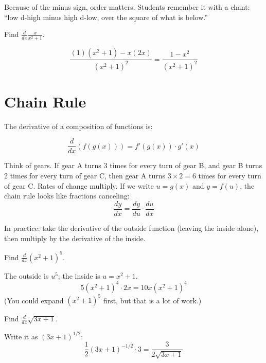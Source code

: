 Because of the minus sign, order matters. Students remember it with a
chant: ``low d-high minus high d-low, over the square of what is
below.''

\begin{Worked}
\begin{Problem}
Find $\frac{d}{dx}\frac{x}{x^2 + 1}$.
\end{Problem}
\begin{Solution}
$$\frac{(1)(x^2 + 1) - x(2x)}{(x^2 + 1)^2} = \frac{1 - x^2}{(x^2 + 1)^2}$$
\end{Solution}
\end{Worked}

\section{Chain Rule}

The derivative of a composition of functions is:

\begin{equation}
\frac{d}{dx}(f(g(x))) = f'(g(x)) \cdot g'(x)
\end{equation}

Think of gears. If gear A turns 3 times for every turn of gear B, and gear
B turns 2 times for every turn of gear C, then gear A turns $3 \times 2 =
6$ times for every turn of gear C. Rates of change multiply. If we write
$u = g(x)$ and $y = f(u)$, the chain rule looks like fractions canceling:
$$\frac{dy}{dx} = \frac{dy}{du} \cdot \frac{du}{dx}$$

In practice: take the derivative of the outside function (leaving the
inside alone), then multiply by the derivative of the inside.

\begin{Worked}
\begin{Problem}
Find $\frac{d}{dx}(x^2 + 1)^5$.
\end{Problem}
\begin{Solution}
The outside is $u^5$; the inside is $u = x^2 + 1$.
$$5(x^2 + 1)^4 \cdot 2x = 10x(x^2 + 1)^4$$
(You could expand $(x^2+1)^5$ first, but that is a lot of work.)
\end{Solution}
\end{Worked}

\begin{Worked}
\begin{Problem}
Find $\frac{d}{dx}\sqrt{3x + 1}$.
\end{Problem}
\begin{Solution}
Write it as $(3x + 1)^{1/2}$:
$$\frac{1}{2}(3x + 1)^{-1/2} \cdot 3 = \frac{3}{2\sqrt{3x + 1}}$$
\end{Solution}
\end{Worked}

